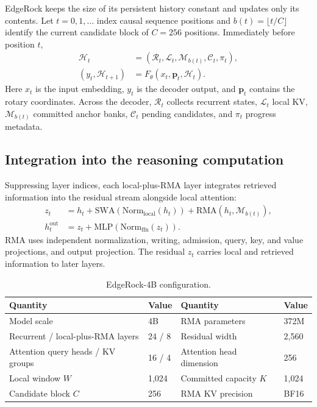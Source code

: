 EdgeRock keeps the size of its persistent history constant and updates only its contents. Let $t=0,1,\ldots$ index causal sequence positions and $b(t)=\lfloor t/C\rfloor$ identify the current candidate block of $C=256$ positions. Immediately before position $t$,
\begin{align}
\mathcal H_t&=(\mathcal R_t,\mathcal L_t,\mathcal M_{b(t)},\mathcal C_t,\pi_t),\label{eq:history-state}\\
(y_t,\mathcal H_{t+1})&=F_\theta(x_t,\mathbf p_t,\mathcal H_t).\label{eq:history-transition}
\end{align}
Here $x_t$ is the input embedding, $y_t$ is the decoder output, and $\mathbf p_t$ contains the rotary coordinates. Across the decoder, $\mathcal R_t$ collects recurrent states, $\mathcal L_t$ local KV, $\mathcal M_{b(t)}$ committed anchor banks, $\mathcal C_t$ pending candidates, and $\pi_t$ progress metadata.

\subsection{Integration into the reasoning computation}

Suppressing layer indices, each local-plus-RMA layer integrates retrieved information into the residual stream alongside local attention:
\begin{align}
z_t &= h_t+\mathrm{SWA}(\mathrm{Norm}_{\mathrm{local}}(h_t))+\mathrm{RMA}(h_t,\mathcal M_{b(t)}),\\
h_t^{\mathrm{out}} &= z_t+\mathrm{MLP}(\mathrm{Norm}_{\mathrm{ffn}}(z_t)).
\end{align}
RMA uses independent normalization, writing, admission, query, key, and value projections, and output projection. The residual $z_t$ carries local and retrieved information to later layers.

\begin{table}[!htbp]
\centering\small
\caption{EdgeRock-4B configuration.}
\label{tab:architecture}
\begin{tabularx}{\linewidth}{@{}YlYl@{}}
\toprule
Quantity & Value & Quantity & Value\\
\midrule
Model scale & 4B & RMA parameters & 372M\\
Recurrent / local-plus-RMA layers & 24 / 8 & Residual width & 2,560\\
Attention query heads / KV groups & 16 / 4 & Attention head dimension & 256\\
Local window $W$ & 1,024 & Committed capacity $K$ & 1,024\\
Candidate block $C$ & 256 & RMA KV precision & BF16\\
\bottomrule
\end{tabularx}
\end{table}


